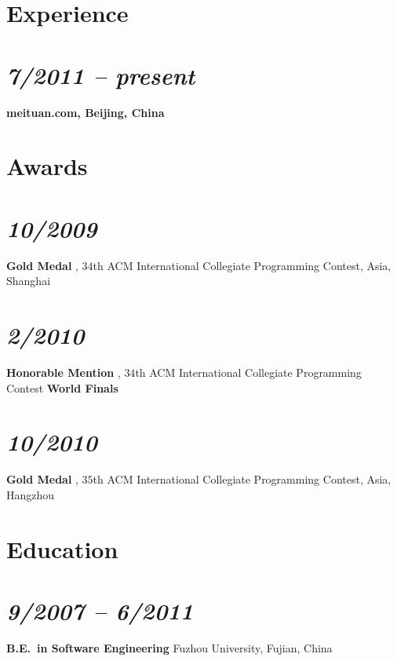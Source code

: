 \documentclass[margin,line]{res}
\newcommand{\ressection}[1]{
    {{\fontfamily{phv}\selectfont\large#1}}
}
\begin{document}
\begin{resume}
\section{\ressection{Experience}}
\vspace{1cm}
\section{\em 7/2011 -- present}
\textbf{meituan.com, Beijing, China }\\

\section{\ressection{Awards}}
\vspace{5mm}
\section{\em 10/2009} \textbf{Gold Medal} , $34$th ACM International
Collegiate Programming Contest, Asia, Shanghai\vspace{-5mm}

\section{\em 2/2010} \textbf{Honorable Mention} , $34$th ACM International
Collegiate Programming Contest \textbf{World Finals}\vspace{-5mm}

\section{\em 10/2010} \textbf{Gold Medal} , $35$th ACM International
Collegiate Programming Contest, Asia, Hangzhou


\section{\ressection{Education}}

\section{\em 9/2007 -- 6/2011}
\textbf{B.E.\  in Software Engineering} \newline
 Fuzhou University, Fujian, China
 \newline

\end{resume}
\end{document}
